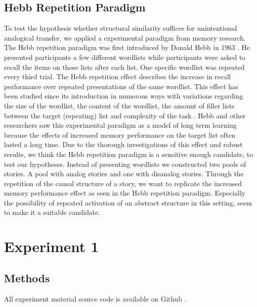 \documentclass[a4paper,man,natbib,floatsintext,import]{apa6}
\begin{document}
\subsection{Hebb Repetition Paradigm}
To test the hypothesis whether structural similarity suffices for unintentional analogical transfer, we applied a experimental paradigm from memory research. The Hebb repetition paradigm was first introduced by Donald Hebb in 1963 \citep{Lafond2010}. He presented participants a few different wordlists while participants were asked to recall the items on those lists after each list. One specific wordlist was repeated every third trial. The Hebb repetition effect describes the increase in recall performance over repeated presentations of the same wordlist. This effect has been studied since its introduction in numerous ways with variations regarding the size of the wordlist, the content of the wordlist, the amount of filler lists between the target (repeating) list and complexity of the task \citep{Lafond2010,Oberauer2015}.
Hebb and other researchers saw this experimental paradigm as a model of long term learning because the effects of increased memory performance on the target list often lasted a long time. Due to the thorough investigations of this effect and robust results, we think the Hebb repetition paradigm is a sensitive enough candidate, to test our hypotheses. Instead of presenting wordlists we constructed two pools of stories. A pool with analog stories and one with disanalog stories. Through the repetition of the causal structure of a story, we want to replicate the increased memory performance effect as seen in the Hebb repetition paradigm. Especially the possibility of repeated activation of an abstract structure in this setting, seem to make it a suitable candidate.

\newpage
\section{Experiment 1}
\subsection{Methods}
All experiment material source code is available on Github \citep{Oesch2016}.
\end{document}
